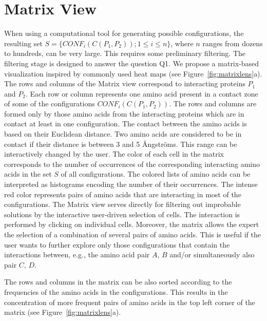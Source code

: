 \documentclass{bmcart}
\def\MatView {Matrix view\xspace}
\begin{document}

\section{Matrix View}
\label{sec:matview}
When using a computational tool for generating possible configurations, the resulting set $S = \{CONF_i(C(P_1,P_2)); 1 \leq i \leq n\}$, where $n$ ranges from dozens to hundreds, can be very large. 
This requires some preliminary filtering.
The filtering stage is designed to answer the question Q1.
We propose a matrix-based visualization inspired by commonly used heat maps (see Figure~\ref{fig:matrixlens}a).
The rows and columns of the \MatView correspond to interacting proteins $P_1$ and $P_2$.
Each row or column represents one amino acid present in a contact zone of some of the configurations $CONF_i(C(P_1,P_2))$. 
The rows and columns are formed only by those amino acids from the interacting proteins which are in contact at least in one configuration.
The contact between the amino acids is based on their Euclidean distance. 
Two amino acids are considered to be in contact if their distance is between 3 and 5 \AA ngstr\"{o}ms.
This range can be interactively changed by the user.
The color of each cell in the matrix corresponds to the number of occurrences of the corresponding interacting amino acids in the set $S$ of all configurations. 
The colored lists of amino acids can be interpreted as histograms encoding the number of their occurrences.
The intense red color represents pairs of amino acids that are interacting in most of the configurations.
The \MatView serves directly for filtering out improbable solutions by the interactive user-driven selection of cells.
The interaction is performed by clicking on individual cells. 
Moreover, the matrix allows the expert the selection of a combination of several pairs of amino acids.
This is useful if the user wants to further explore only those configurations that contain the interactions between, e.g., the amino acid pair $A$, $B$ and/or simultaneously also pair $C$, $D$. 

The rows and columns in the matrix can be also sorted according to the frequencies of the amino acids in the configurations. 
This results in the concentration of more frequent pairs of amino acids in the top left corner of the matrix (see Figure~\ref{fig:matrixlens}a).
\end{document}
